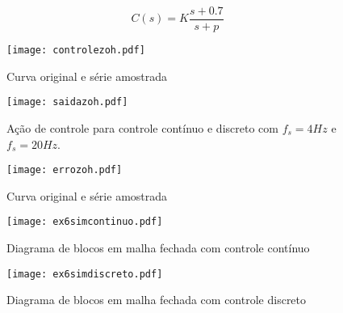     \begin{equation}
    \label{eq:controladorpade}
        C(s) = K \frac{s + 0.7}{s + p}
    \end{equation}
    
    \begin{figure}[H]
	\center
	\texttt{[image: controlezoh.pdf]}
	\caption{Curva original e série amostrada}
	\label{fig:ex6controle}
    \end{figure}

\newpage

    \begin{figure}[htp]
	\center
	\texttt{[image: saidazoh.pdf]}
	\caption{Ação de controle para controle contínuo e discreto com $f_s = 4 Hz$ e $f_s = 20 Hz$. }
	\label{fig:ex6saida}
    \end{figure}

    \begin{figure}[H]
	\center
	\texttt{[image: errozoh.pdf]}
	\caption{Curva original e série amostrada}
	\label{fig:ex6erro}
    \end{figure}
    
    \begin{figure}[H]
	\center
	\texttt{[image: ex6simcontinuo.pdf]}
	\caption{Diagrama de blocos em malha fechada com controle contínuo}
	\label{fig:ex6continuo}
    \end{figure}

    \begin{figure}[H]
	\center
	\texttt{[image: ex6simdiscreto.pdf]}
	\caption{Diagrama de blocos em malha fechada com controle discreto}
	\label{fig:ex6discreto}
    \end{figure}